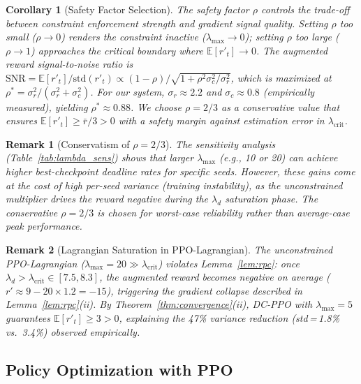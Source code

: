 \documentclass[journal]{IEEEtran}
\newtheorem{corollary}{Corollary}
\newtheorem{remark}{Remark}
\newcommand{\ld}{\lambda_d}
\begin{document}
\begin{corollary}[Safety Factor Selection]
\label{cor:rho}
The safety factor $\rho$ controls the trade-off between
constraint enforcement strength and gradient signal quality.
Setting $\rho$ too small ($\rho \to 0$) renders the constraint
inactive ($\lambda_{\max} \to 0$); setting $\rho$ too large
($\rho \to 1$) approaches the critical boundary where
$\mathbb{E}[r'_t] \to 0$.
The augmented reward signal-to-noise ratio is
$\text{SNR} = \mathbb{E}[r'_t] / \text{std}(r'_t)
  \propto (1-\rho) / \sqrt{1 + \rho^2 \sigma_c^2/\sigma_r^2}$,
which is maximized at $\rho^* = \sigma_r^2 / (\sigma_r^2 + \sigma_c^2)$.
For our system, $\sigma_r \approx 2.2$ and $\sigma_c \approx 0.8$
(empirically measured), yielding $\rho^* \approx 0.88$.
We choose $\rho = 2/3$ as a conservative value that ensures
$\mathbb{E}[r'_t] \ge \bar{r}/3 > 0$ with a safety margin
against estimation error in $\lambda_{\text{crit}}$.
\end{corollary}

\begin{remark}[Conservatism of $\rho = 2/3$]
\label{rem:rho}
The sensitivity analysis (Table~\ref{tab:lambda_sens})
shows that larger $\lambda_{\max}$ (e.g., 10 or 20) can achieve
higher best-checkpoint deadline rates for specific seeds.
However, these gains come at the cost of high per-seed variance
(training instability), as the unconstrained multiplier drives
the reward negative during the $\ld$ saturation phase.
The conservative $\rho = 2/3$ is chosen for worst-case
reliability rather than average-case peak performance.
\end{remark}

\begin{remark}[Lagrangian Saturation in PPO-Lagrangian]
\label{rem:saturation}
The unconstrained PPO-Lagrangian ($\lambda_{\max} = 20 \gg \lambda_{\text{crit}}$)
violates Lemma~\ref{lem:rpc}: once $\ld > \lambda_{\text{crit}} \in [7.5, 8.3]$,
the augmented reward becomes negative on average
($r' \approx 9 - 20 \times 1.2 = -15$), triggering
the gradient collapse described in Lemma~\ref{lem:rpc}(ii).
By Theorem~\ref{thm:convergence}(ii), DC-PPO with $\lambda_{\max}{=}5$
guarantees $\mathbb{E}[r'_t] \ge 3 > 0$, explaining the
47\% variance reduction (std\,=\,1.8\% vs.\ 3.4\%)
observed empirically.
\end{remark}

\subsection{Policy Optimization with PPO}
\end{document}
